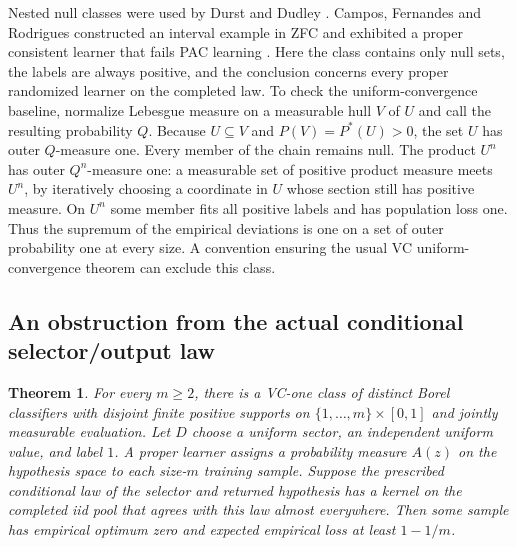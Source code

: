 \documentclass[11pt]{article}
\newtheorem{theorem}{Theorem}[section]
\theoremstyle{definition}\newtheorem{definition}[theorem]{Definition}
\begin{document}
Nested null classes were used by Durst and Dudley \cite{durst}. Campos,
Fernandes and Rodrigues constructed an interval example in ZFC and exhibited
a proper consistent learner that fails PAC learning \cite{campos}. Here the
class contains only null sets, the labels are always positive, and the
conclusion concerns every proper randomized learner on the completed law.
To check the uniform-convergence baseline, normalize Lebesgue measure on
a measurable hull $V$ of $U$ and call the resulting probability $Q$.
Because $U\subseteq V$ and $P(V)=P^*(U)>0$, the set $U$ has outer
$Q$-measure one. Every member of the chain remains null. The product
$U^n$ has outer $Q^n$-measure one: a measurable set of positive product
measure meets $U^n$, by iteratively choosing a coordinate in $U$ whose
section still has positive measure. On $U^n$ some member fits all positive
labels and has population loss one. Thus the supremum of the empirical
deviations is one on a set of outer probability one at every size.
A convention ensuring the usual VC uniform-convergence theorem can
exclude this class.

\subsection{An obstruction from the actual conditional selector/output law}

\begin{theorem}\label{thm:finite-cmi-obstruction}
For every $m\ge2$, there is a VC-one class of distinct Borel classifiers
with disjoint finite positive supports on $\{1,\ldots,m\}\times[0,1]$ and
jointly measurable evaluation. Let $D$ choose a uniform sector, an independent
uniform value, and label $1$. A proper learner assigns a probability measure
$A(z)$ on the hypothesis space to each size-$m$ training sample. Suppose the
prescribed conditional law of the selector and returned hypothesis has a
kernel on the completed iid pool that agrees with this law almost everywhere.
Then some sample has empirical optimum zero and expected empirical loss at
least $1-1/m$.
\end{theorem}
\end{document}
